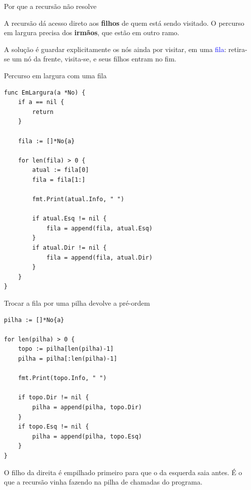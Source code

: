 \documentclass{beamer}
\newcommand{\tcb}[1]{\textcolor{blue}{#1}}
\begin{document}
\begin{frame}{Por que a recursão não resolve}
  \begin{block}{}
    A recursão dá acesso direto aos \textbf{filhos} de quem está sendo
    visitado. O percurso em largura precisa dos \textbf{irmãos}, que estão em
    outro ramo.
  \end{block}

  \vspace{0.5cm}
  A solução é guardar explicitamente os nós ainda por visitar, em uma
  \tcb{fila}: retira-se um nó da frente, visita-se, e seus filhos entram no fim.
\end{frame}

\begin{frame}[fragile]{Percurso em largura com uma fila}
  \begin{verbatim}
func EmLargura(a *No) {
    if a == nil {
        return
    }

    fila := []*No{a}

    for len(fila) > 0 {
        atual := fila[0]
        fila = fila[1:]

        fmt.Print(atual.Info, " ")

        if atual.Esq != nil {
            fila = append(fila, atual.Esq)
        }
        if atual.Dir != nil {
            fila = append(fila, atual.Dir)
        }
    }
}
  \end{verbatim}
\end{frame}

\begin{frame}[fragile]{Trocar a fila por uma pilha devolve a pré-ordem}
  \begin{verbatim}
pilha := []*No{a}

for len(pilha) > 0 {
    topo := pilha[len(pilha)-1]
    pilha = pilha[:len(pilha)-1]

    fmt.Print(topo.Info, " ")

    if topo.Dir != nil {
        pilha = append(pilha, topo.Dir)
    }
    if topo.Esq != nil {
        pilha = append(pilha, topo.Esq)
    }
}
  \end{verbatim}

  \footnotesize O filho da direita é empilhado primeiro para que o da esquerda
  saia antes. É o que a recursão vinha fazendo na pilha de chamadas do programa.
\end{frame}
\end{document}
